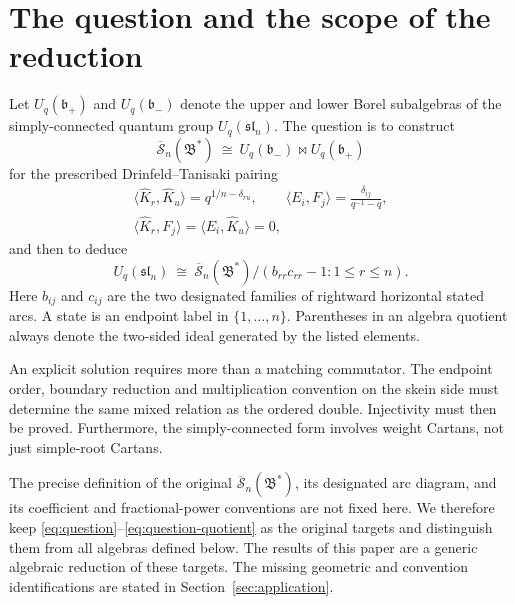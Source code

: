 \documentclass[11pt]{article}
\theoremstyle{definition}
\theoremstyle{remark}
\newcommand{\cS}{\overline{\mathscr{S}}}
\begin{document}
\section{The question and the scope of the reduction}

Let $U_q(\mathfrak b_+)$ and $U_q(\mathfrak b_-)$ denote the upper and lower Borel subalgebras of the simply-connected quantum group $U_q(\mathfrak{sl}_n)$. The question is to construct
\begin{equation}\label{eq:question}
 \cS_n(\mathfrak B^*)\ \cong\ U_q(\mathfrak b_-)\bowtie U_q(\mathfrak b_+)
\end{equation}
for the prescribed Drinfeld--Tanisaki pairing
\begin{equation}\label{eq:requested-pairing}
 \begin{gathered}
 \langle\hat K_r,\hat K_u\rangle=q^{1/n-\delta_{ru}},\qquad
 \langle E_i,F_j\rangle=\frac{\delta_{ij}}{q^{-1}-q},\\
 \langle\hat K_r,F_j\rangle=\langle E_i,\hat K_u\rangle=0,
 \end{gathered}
\end{equation}
and then to deduce
\begin{equation}\label{eq:question-quotient}
 U_q(\mathfrak{sl}_n)\ \cong\ \cS_n(\mathfrak B^*)/
 (b_{rr}c_{rr}-1:1\leq r\leq n).
\end{equation}
Here $b_{ij}$ and $c_{ij}$ are the two designated families of rightward horizontal stated arcs. A state is an endpoint label in $\{1,\ldots,n\}$. Parentheses in an algebra quotient always denote the two-sided ideal generated by the listed elements.

An explicit solution requires more than a matching commutator. The endpoint order, boundary reduction and multiplication convention on the skein side must determine the same mixed relation as the ordered double. Injectivity must then be proved. Furthermore, the simply-connected form involves weight Cartans, not just simple-root Cartans.

The precise definition of the original $\cS_n(\mathfrak B^*)$, its designated arc diagram, and its coefficient and fractional-power conventions are not fixed here. We therefore keep \eqref{eq:question}--\eqref{eq:question-quotient} as the original targets and distinguish them from all algebras defined below. The results of this paper are a generic algebraic reduction of these targets. The missing geometric and convention identifications are stated in Section~\ref{sec:application}.
\end{document}
